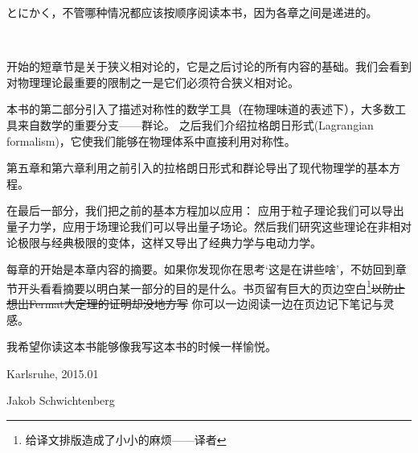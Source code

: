 とにかく，不管哪种情况都应该按顺序阅读本书，因为各章之间是递进的。

\ 

开始的短章节是关于狭义相对论的，它是之后讨论的所有内容的基础。我们会看到对物理理论最重要的限制之一是它们必须符合狭义相对论。 

本书的第二部分引入了描述对称性的数学工具（在物理味道的表述下），大多数工具来自数学的重要分支——群论。 之后我们介绍拉格朗日形式(Lagrangian formalism)，它使我们能够在物理体系中直接利用对称性。 

第五章和第六章利用之前引入的拉格朗日形式和群论导出了现代物理学的基本方程。

在最后一部分，我们把之前的基本方程加以应用： %
应用于粒子理论我们可以导出量子力学，应用于场理论我们可以导出量子场论。然后我们研究这些理论在非相对论极限与经典极限的变体，这样又导出了经典力学与电动力学。

每章的开始是本章内容的摘要。如果你发现你在思考`这是在讲些啥'，不妨回到章节开头看看摘要以明白某一部分的目的是什么。书页留有巨大的页边空白\footnote{给译文排版造成了小小的麻烦——译者}\sout{以防止想出Fermat大定理的证明却没地方写}
你可以一边阅读一边在页边记下笔记与灵感。

我希望你读这本书能够像我写这本书的时候一样愉悦。

\begin{flushright}
Karlsruhe, 2015.01

Jakob Schwichtenberg
\end{flushright}
